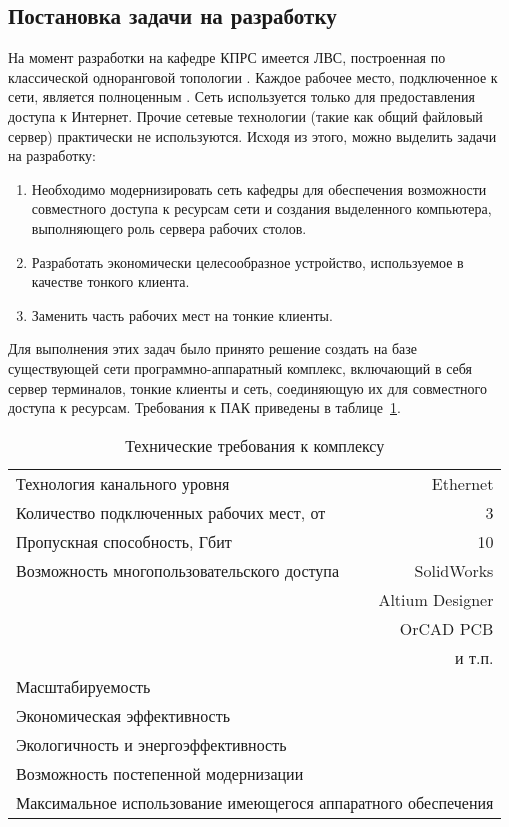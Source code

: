 \subsection{Постановка задачи на разработку}

На момент разработки на кафедре КПРС имеется ЛВС, построенная по классической
одноранговой топологии . Каждое рабочее место, подключенное к сети, является
полноценным . Сеть используется только для предоставления доступа
к Интернет. Прочие сетевые технологии (такие как общий файловый сервер) практически не
используются. Исходя из этого, можно выделить задачи на разработку:

\begin{enumerate}
    \item Необходимо модернизировать сеть кафедры для обеспечения возможности
        совместного доступа к ресурсам сети и создания выделенного компьютера,
        выполняющего роль сервера рабочих столов.
    \item Разработать экономически целесообразное устройство, используемое в качестве
        тонкого клиента.
    \item Заменить часть рабочих мест на тонкие клиенты.
\end{enumerate}

Для выполнения этих задач было принято решение создать на базе существующей сети
программно-аппаратный комплекс, включающий в себя сервер терминалов, тонкие клиенты и
сеть, соединяющую их для совместного доступа к ресурсам. Требования к ПАК приведены в
таблице~\ref{tab:reqs}.

\begin{table}[h]
    \centering
    \caption{Технические требования к комплексу}
    \label{tab:reqs}
    \begin{tabularx}{\linewidth}{Xr}
        \toprule
        Технология канального уровня & Ethernet \\
        Количество подключенных рабочих мест, от & 3 \\
        Пропускная способность, Гбит & 10 \\
        \midrule
        Возможность многопользовательского доступа & SolidWorks \\
                                                   & Altium Designer \\
                                                   & OrCAD PCB \\
                                                   & и т.п. \\
        \midrule
        Масштабируемость & \\
        Экономическая эффективность & \\
        Экологичность и энергоэффективность & \\
        \multicolumn{2}{l}{Возможность постепенной модернизации} \\
        \multicolumn{2}{l}{Максимальное использование имеющегося аппаратного
        обеспечения} \\
        \bottomrule
    \end{tabularx}
\end{table}
